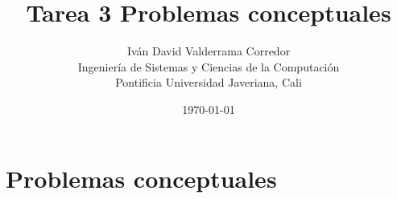 \documentclass[a4paper,12pt]{article}
\title{Tarea 3 Problemas conceptuales}
\author{%
  Iván David Valderrama Corredor\\ %
  Ingeniería de Sistemas y Ciencias de la Computación\\ %
  Pontificia Universidad Javeriana, Cali}
\date{\today}
\newcommand{\subfigureautorefname}{\figureautorefname}
\begin{document}
	
\renewcommand{\tablename}{\bfseries Tabla} %
\renewcommand{\figurename}{\bfseries Figura} %
%
\maketitle

\tableofcontents

\newpage


\section{Problemas conceptuales}
\end{document}
